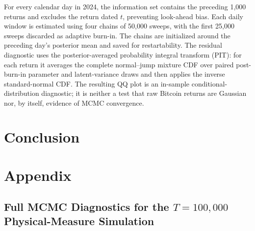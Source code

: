 \documentclass[11pt]{article}
\begin{document}
{\color{red}For every calendar day in 2024, the information set contains the
preceding 1,000 returns and excludes the return dated $t$, preventing
look-ahead bias. Each daily window is estimated using four chains of 50,000
sweeps, with the first 25,000 sweeps discarded as adaptive burn-in. The chains
are initialized around the preceding day's posterior mean and saved for
restartability. The residual diagnostic uses the posterior-averaged
probability integral transform (PIT): for each return it averages the complete
normal--jump mixture CDF over paired post-burn-in parameter and latent-variance
draws and then applies the inverse standard-normal CDF. The resulting QQ plot
is an in-sample conditional-distribution diagnostic; it is neither a test that
raw Bitcoin returns are Gaussian nor, by itself, evidence of MCMC
convergence.}



\section{Conclusion} \label{sec:conclusion}


\singlespacing
\setlength\bibsep{0pt}



\clearpage


\section{Appendix}
\label{sec:appendix}

\clearpage
\subsection{Full MCMC Diagnostics for the $T=100{,}000$ Physical-Measure Simulation}
\label{app:p_t100k_full_mcmc_diagnostics}
\end{document}

